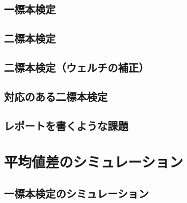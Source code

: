 \documentclass[
  a4paper,
]{ltjsbook}
\begin{document}
\hypertarget{ux4e00ux6a19ux672cux691cux5b9a}{%
\section{一標本検定}\label{ux4e00ux6a19ux672cux691cux5b9a}}

\hypertarget{ux4e8cux6a19ux672cux691cux5b9a}{%
\section{二標本検定}\label{ux4e8cux6a19ux672cux691cux5b9a}}

\hypertarget{ux4e8cux6a19ux672cux691cux5b9aux30a6ux30a7ux30ebux30c1ux306eux88dcux6b63}{%
\section{二標本検定（ウェルチの補正）}\label{ux4e8cux6a19ux672cux691cux5b9aux30a6ux30a7ux30ebux30c1ux306eux88dcux6b63}}

\hypertarget{ux5bfeux5fdcux306eux3042ux308bux4e8cux6a19ux672cux691cux5b9a}{%
\section{対応のある二標本検定}\label{ux5bfeux5fdcux306eux3042ux308bux4e8cux6a19ux672cux691cux5b9a}}

\hypertarget{ux30ecux30ddux30fcux30c8ux3092ux66f8ux304fux3088ux3046ux306aux8ab2ux984c}{%
\section{レポートを書くような課題}\label{ux30ecux30ddux30fcux30c8ux3092ux66f8ux304fux3088ux3046ux306aux8ab2ux984c}}


\hypertarget{ux5e73ux5747ux5024ux5deeux306eux30b7ux30dfux30e5ux30ecux30fcux30b7ux30e7ux30f3}{%
\chapter{平均値差のシミュレーション}\label{ux5e73ux5747ux5024ux5deeux306eux30b7ux30dfux30e5ux30ecux30fcux30b7ux30e7ux30f3}}

\hypertarget{ux4e00ux6a19ux672cux691cux5b9aux306eux30b7ux30dfux30e5ux30ecux30fcux30b7ux30e7ux30f3}{%
\section{一標本検定のシミュレーション}\label{ux4e00ux6a19ux672cux691cux5b9aux306eux30b7ux30dfux30e5ux30ecux30fcux30b7ux30e7ux30f3}}
\end{document}
